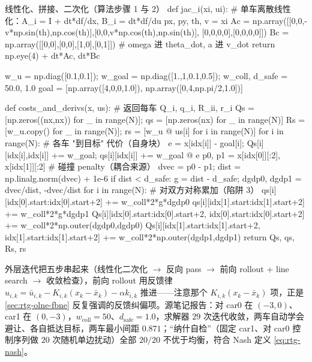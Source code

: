 \begin{codebox}[Python]{线性化、拼接、二次化（算法步骤 1 与 2）}
def jac_i(xi, ui):                             # 单车离散线性化：A_i = I + dt*df/dx, B_i = dt*df/du
    px, py, th, v = xi
    Ac = np.array([[0,0,-v*np.sin(th),np.cos(th)],[0,0,v*np.cos(th),np.sin(th)],
                   [0,0,0,0],[0,0,0,0]])
    Bc = np.array([[0,0],[0,0],[1,0],[0,1]])   # omega 进 theta_dot, a 进 v_dot
    return np.eye(4) + dt*Ac, dt*Bc

w_u = np.diag([0.1,0.1]); w_goal = np.diag([1.,1,0.1,0.5]); w_coll, d_safe = 50.0, 1.0
goal = [np.array([4,0,0,1.0]), np.array([0,4,np.pi/2,1.0])]

def costs_and_derivs(x, us):                    # 返回每车 Q_i, q_i, R_ii, r_i
    Qs = [np.zeros((nx,nx)) for _ in range(N)]; qs = [np.zeros(nx) for _ in range(N)]
    Rs = [w_u.copy() for _ in range(N)];        rs = [w_u @ us[i] for i in range(N)]
    for i in range(N):                          # 各车 "到目标" 代价（自身块）
        e = x[idx[i]] - goal[i]; Qs[i][idx[i],idx[i]] += w_goal; qs[i][idx[i]] += w_goal @ e
    p0, p1 = x[idx[0]][:2], x[idx[1]][:2]       # 碰撞 penalty（耦合来源）
    dvec = p0 - p1; dist = np.linalg.norm(dvec) + 1e-6
    if dist < d_safe:
        g = dist - d_safe; dgdp0, dgdp1 = dvec/dist, -dvec/dist
        for i in range(N):                      # 对双方对称累加（陷阱 3）
            qs[i][idx[0].start:idx[0].start+2] += w_coll*2*g*dgdp0
            qs[i][idx[1].start:idx[1].start+2] += w_coll*2*g*dgdp1
            Qs[i][idx[0].start:idx[0].start+2, idx[0].start:idx[0].start+2] += w_coll*2*np.outer(dgdp0,dgdp0)
            Qs[i][idx[1].start:idx[1].start+2, idx[1].start:idx[1].start+2] += w_coll*2*np.outer(dgdp1,dgdp1)
    return Qs, qs, Rs, rs
\end{codebox}

\noindent 外层迭代把五步串起来（线性化二次化 $\to$ 反向 pass $\to$ 前向 rollout + line search $\to$ 收敛检查），前向 rollout 用反馈律 $u_{i,k}=\bar u_{i,k}-K_{i,k}(x_k-\bar x_k)-\alpha k_{i,k}$ 推进——注意那个 $K_{i,k}(x_k-\bar x_k)$ 项，正是 \cref{sec:rtg-olne-fbne} 反复强调的反馈纠偏项。源笔记报告：对 car0 在 $(-3,0)$、car1 在 $(0,-3)$，$w_{\text{coll}}=50$、$d_{\text{safe}}=1.0$，求解器 $29$ 次迭代收敛，两车自动学会避让、各自抵达目标，两车最小间距 $0.871$；“纳什自检”（固定 car1、对 car0 控制序列做 $20$ 次随机单边扰动）全部 $20/20$ 不优于均衡，符合 Nash 定义 \cref{eq:rtg-nash}\cite{fridovich2020efficient}。

